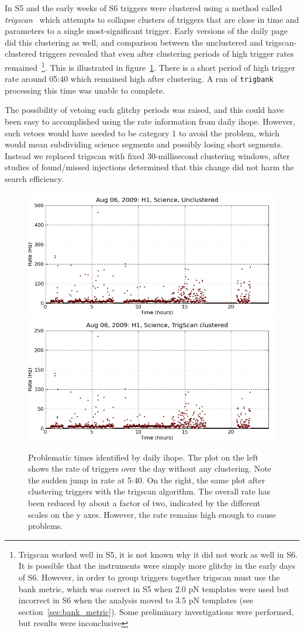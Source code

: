 In S5 and the early weeks of S6 triggers were clustered using a method
called \emph{trigscan}~\cite{SenguptaTrigScan:2008} which attempts to
collapse clusters of triggers that are close in time and parameters to
a single most-significant trigger.  Early versions of the daily page
did this clustering as well, and comparison between the unclustered
and trigscan-clustered triggers revealed that even after clustering
periods of high trigger rates remained~\footnote{Trigscan worked well
in S5, it is not known why it did not work as well in S6.  It is
possible that the instruments were simply more glitchy in the early
days of S6.  However, in order to group triggers together trigscan
must use the bank metric, which was correct in S5 when 2.0 pN
templates were used but incorrect in S6 when the analysis moved to 3.5
pN templates (see section~\ref{sec:bank_metric}).  Some preliminary
investigations were performed, but results were inconclusive}.  This
is illustrated in figure~\ref{f:daily_ihope_high_rates}.  There is a
short period of high trigger rate around 05:40 which remained high
after clustering.  A run of \texttt{trigbank} processing this time was
unable to complete.

The possibility of vetoing such glitchy periods was raised, and this
could have been easy to accomplished using the rate information from
daily ihope.  However, such vetoes would have needed to be category 1 to
avoid the problem, which would mean subdividing science segments and
possibly losing short segments.  Instead we replaced trigscan with
fixed 30-millisecond clustering windows, after studies of found/missed
injections determined that this change did not harm the search
efficiency. 

\begin{figure}
  \includegraphics[width=0.5\linewidth]{figures/detchar/20090806_H1_0_UNCLUSTERED_rate_vs_time}
  \includegraphics[width=0.5\linewidth]{figures/detchar/20090806_H1_0_TS_CLUSTERED_rate_vs_time}
  \caption[Problematic times identified by daily ihope]{
  \label{f:daily_ihope_high_rates}
Problematic times identified by daily ihope.  The plot on the left
shows the rate of triggers over the day without any clustering.  Note
the sudden jump in rate at 5:40.  On the right, the same plot after
clustering triggers with the trigscan algorithm.  The overall rate has
been reduced by about a factor of two, indicated by the different
scales on the y axes.  However, the rate remains high enough to cause
problems.
}
\end{figure}%

